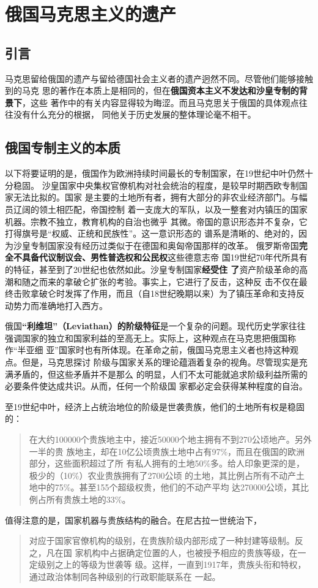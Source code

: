\chapter{俄国马克思主义的遗产}

\section{引言}
马克思留给俄国的遗产与留给德国社会主义者的遗产迥然不同。尽管他们能够接触到的马克
思的著作在本质上是相同的，但在\textbf{俄国资本主义不发达和沙皇专制的背景下}，这些
著作中的有关内容显得较为晦涩。而且马克思关于俄国的具体观点往往没有什么充分的根据，
同他关于历史发展的整体理论毫不相干。

\section{俄国专制主义的本质}
以下将要证明的是，俄国作为欧洲持续时间最长的专制国家，在19世纪中叶仍然十分稳固。
沙皇国家中央集权官僚机构对社会统治的程度，是较早时期西欧专制国家无法比拟的。国家
是主要的土地所有者，拥有大部分的非农业经济部门。与幅员辽阔的领土相匹配，帝国控制
着一支庞大的军队，以及一整套对内镇压的国家机器。宗教不独立，教育机构的自治也微乎
其微。帝国的意识形态并不复杂，它打得旗号是“权威、正统和民族性”。这一意识形态的
谱系是清晰的、绝对的，因为沙皇专制国家没有经历过类似于在德国和奥匈帝国那样的改革。
俄罗斯帝国\textbf{完全不具备代议制议会、男性普选权和公民权}这些德意志帝
国19世纪70年代所具有的特征，甚至到了20世纪也依然如此。沙皇专制国家\textbf{经受住
  了}资产阶级革命的高潮和随之而来的拿破仑扩张的考验。事实上，它进行了反击，这种反
击不仅在最终击败拿破仑时发挥了作用，而且（自18世纪晚期以来）为了镇压革命和支持反
动势力而准确地打入西方。


俄国\textbf{“利维坦”（Leviathan）的阶级特征}是一个复杂的问题。现代历史学家往往
强调国家的独立和国家利益的至高无上。实际上，这种观点在马克思把俄国称作“半亚细
亚”国家时也有所体现。在革命之前，俄国马克思主义者也持这种观点。但是，马克思探讨
阶级与国家关系的理论蕴涵着复杂的视角。尽管现实是充满矛盾的，但这些矛盾并不是那么
的明显，人们不太可能就追求阶级利益所需的必要条件使达成共识。从而，任何一个阶级国
家都必定会获得某种程度的自治。

至19世纪中叶，经济上占统治地位的阶级是世袭贵族，他们的土地所有权是稳固的：
\begin{quotation}
  在大约100000个贵族地主中，接近50000个地主拥有不到270公顷地产。另外一半的贵
  族地主，却在10亿公顷贵族土地中占有97\%，而且在俄国的欧洲部分，这些面积超过了所
  有私人拥有的土地50\%多。给人印象更深的是，极少的（10\%）农业贵族拥有了2700公顷
  的土地，其比例占所有不动产土地中的75\%。甚至155个超级权贵，他们的不动产平均
  达270000公顷，其比例占所有贵族土地的33\%。
\end{quotation}
值得注意的是，国家机器与贵族结构的融合。在尼古拉一世统治下，
\begin{quotation}
  对应于国家官僚机构的级别，在贵族阶级内部形成了一种封建等级制。反之，凡在国
  家机构中占据确定位置的人，也被授予相应的贵族等级，在一定级别之上的等级为世袭等
  级。这样，一直到1917年，贵族头衔和特权，通过政治体制同各种级别的行政职能联系在
  一起。
\end{quotation}

